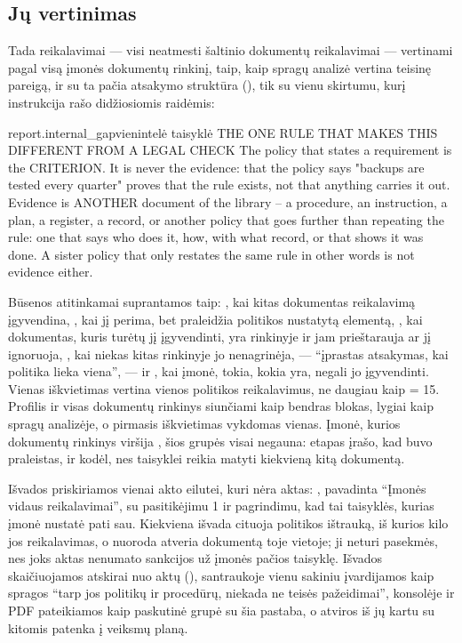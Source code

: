 \subsection{Jų vertinimas}

Tada reikalavimai --- visi neatmesti šaltinio dokumentų reikalavimai --- vertinami pagal visą
įmonės dokumentų rinkinį, taip, kaip spragų analizė vertina teisinę pareigą, ir su ta pačia
atsakymo struktūra (), tik su vienu skirtumu, kurį instrukcija rašo
didžiosiomis raidėmis:

\begin{promptexcerpt}{report.internal_gap}{vienintelė taisyklė}
  THE ONE RULE THAT MAKES THIS DIFFERENT FROM A LEGAL CHECK
  The policy that states a requirement is the CRITERION. It is never the evidence: that the policy says "backups are tested every quarter" proves that the rule exists, not that anything carries it out. Evidence is ANOTHER document of the library – a procedure, an instruction, a plan, a register, a record, or another policy that goes further than repeating the rule: one that says who does it, how, with what record, or that shows it was done. A sister policy that only restates the same rule in other words is not evidence either.
\end{promptexcerpt}

Būsenos atitinkamai suprantamos taip: , kai kitas dokumentas reikalavimą
įgyvendina, , kai jį perima, bet praleidžia politikos nustatytą elementą,
, kai dokumentas, kuris turėtų jį įgyvendinti, yra rinkinyje ir jam prieštarauja
ar jį ignoruoja, , kai niekas kitas rinkinyje jo nenagrinėja, --- \enquote{įprastas
atsakymas, kai politika lieka viena}, --- ir , kai įmonė, tokia, kokia yra, negali jo
įgyvendinti. Vienas iškvietimas vertina vienos politikos reikalavimus, ne daugiau kaip
 = 15. Profilis ir visas dokumentų rinkinys siunčiami kaip bendras blokas, lygiai
kaip spragų analizėje, o pirmasis iškvietimas vykdomas vienas. Įmonė, kurios dokumentų rinkinys
viršija , šios grupės visai negauna: etapas įrašo, kad buvo praleistas,
ir kodėl, nes taisyklei reikia matyti kiekvieną kitą dokumentą.

Išvados priskiriamos vienai akto eilutei, kuri nėra aktas:  ,
pavadinta \enquote{Įmonės vidaus reikalavimai}, su pasitikėjimu 1 ir pagrindimu, kad tai
taisyklės, kurias įmonė nustatė pati sau. Kiekviena išvada cituoja politikos ištrauką, iš kurios
kilo jos reikalavimas, o nuoroda atveria dokumentą toje vietoje; ji neturi pasekmės, nes joks aktas
nenumato sankcijos už įmonės pačios taisyklę. Išvados skaičiuojamos atskirai nuo aktų
(), santraukoje vienu sakiniu įvardijamos kaip spragos \enquote{tarp jos
politikų ir procedūrų, niekada ne teisės pažeidimai}, konsolėje ir PDF pateikiamos kaip
paskutinė grupė su šia pastaba, o atviros iš jų kartu su kitomis patenka į veiksmų planą.

